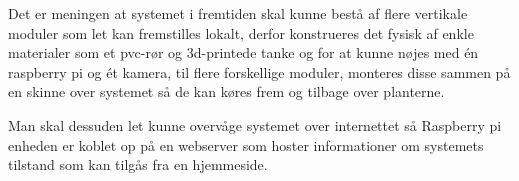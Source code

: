 Det er meningen at systemet i fremtiden skal kunne bestå af flere vertikale moduler som let kan fremstilles lokalt, derfor konstrueres det fysisk af enkle materialer som et pvc-rør og 3d-printede tanke og for at kunne nøjes med én raspberry pi og ét kamera, til flere forskellige moduler, monteres disse sammen på en skinne over systemet så de kan køres frem og tilbage over planterne.

Man skal dessuden let kunne overvåge systemet over internettet så Raspberry pi enheden er koblet op på en webserver som hoster informationer om systemets tilstand som kan tilgås fra en hjemmeside.











